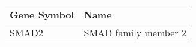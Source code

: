 \begin{tabular}{ll}
\toprule
Gene Symbol &                 Name \\
\midrule
      SMAD2 & SMAD family member 2 \\
\bottomrule
\end{tabular}
